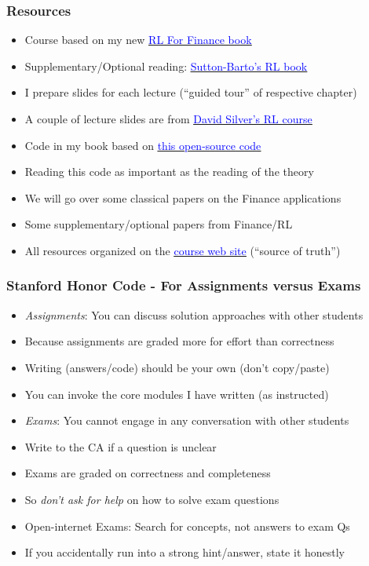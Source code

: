 \documentclass[handout]{beamer}
\begin{document}
\begin{frame}
\frametitle{Resources}
\pause
\begin{itemize}[<+->]
\item Course based on my new \href{http://stanford.edu/~ashlearn/RLForFinanceBook/book.pdf}{\underline{\textcolor{blue}{RL For Finance book}}}
\item Supplementary/Optional reading:  \href{http://incompleteideas.net/book/the-book-2nd.html}{\underline{\textcolor{blue}{Sutton-Barto's RL book}}}
\item I prepare slides for each lecture (``guided tour'' of respective chapter)
\item A couple of lecture slides are from \href{https://www.davidsilver.uk/teaching/}{\underline{\textcolor{blue}{David Silver's RL course}}}
\item Code in my book based on \href{https://github.com/TikhonJelvis/RL-Book}{\underline{\textcolor{blue}{this open-source code}}}
\item Reading this code as important as the reading of the theory 
\item We will go over some classical papers on the Finance applications
\item Some supplementary/optional papers from Finance/RL
\item All resources organized on the \href{http://cme241.stanford.edu}{\underline{\textcolor{blue}{course web site}}} (``source of truth'')
\end{itemize}
\end{frame}

\begin{frame}
\frametitle{Stanford Honor Code - For Assignments versus Exams}
\pause
\begin{itemize}[<+->]
\item {\em Assignments}: You can discuss solution approaches with other students
\item Because assignments are graded more for effort than correctness
\item Writing (answers/code) should be your own (don't copy/paste)
\item You can invoke the core modules I have written (as instructed)
\item {\em Exams}: You cannot engage in any conversation with other students
\item Write to the CA if a question is unclear
\item Exams are graded on correctness and completeness
\item So {\em don't ask for help} on how to solve exam questions
\item Open-internet Exams: Search for concepts, not answers to exam Qs
\item If you accidentally run into a strong hint/answer, state it honestly
\end{itemize}
\end{frame}
\end{document}
